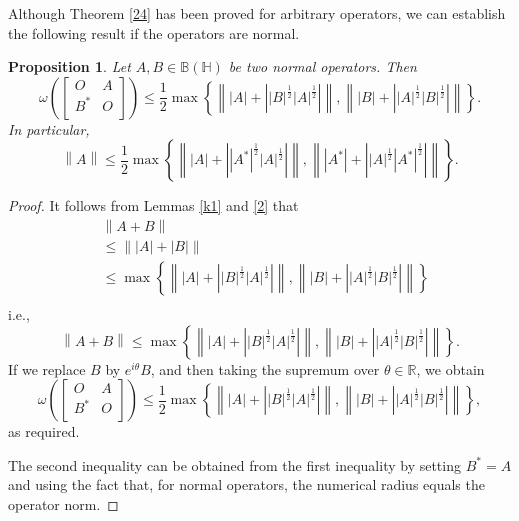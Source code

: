 \documentclass[12pt,twoside,reqno]{amsart}
\newtheorem{proposition}{Proposition}[section]
\numberwithin{equation}{section}
\begin{document}
Although Theorem \ref{24} has been proved for arbitrary operators, we can establish the following result if the operators are normal.
\begin{proposition}
Let $A, B\in \mathbb B\left( \mathbb H \right)$ be two normal operators. Then
\[\omega \left( \left[ \begin{matrix}
   O & A  \\
   {{B}^{*}} & O  \\
\end{matrix} \right] \right)\le \frac{1}{2}\max \left\{ \left\| \left| A \right|+\left| {{\left| B \right|}^{\frac{1}{2}}}{{\left| A \right|}^{\frac{1}{2}}} \right| \right\|,\left\| \left| B \right|+\left| {{\left| A \right|}^{\frac{1}{2}}}{{\left| B \right|}^{\frac{1}{2}}} \right| \right\| \right\}.\]
In particular,
\[\left\| A \right\|\le \frac{1}{2}\max \left\{ \left\| \left| A \right|+\left| {{\left| {{A}^{*}} \right|}^{\frac{1}{2}}}{{\left| A \right|}^{\frac{1}{2}}} \right| \right\|,\left\| \left| {{A}^{*}} \right|+\left| {{\left| A \right|}^{\frac{1}{2}}}{{\left| {{A}^{*}} \right|}^{\frac{1}{2}}} \right| \right\| \right\}.\]
\end{proposition}
\begin{proof}
It follows from Lemmas \ref{k1} and \ref{2} that
\[\begin{aligned}
  & \left\| A+B \right\| \\ 
 & \le \left\| \left| A \right|+\left| B \right| \right\| \\ 
 & \le \max \left\{ \left\| \left| A \right|+\left| {{\left| B \right|}^{\frac{1}{2}}}{{\left| A \right|}^{\frac{1}{2}}} \right| \right\|,\left\| \left| B \right|+\left| {{\left| A \right|}^{\frac{1}{2}}}{{\left| B \right|}^{\frac{1}{2}}} \right| \right\| \right\} \\ 
\end{aligned}\]
i.e.,
\begin{equation}\label{7}
\left\| A+B \right\|\le \max \left\{ \left\| \left| A \right|+\left| {{\left| B \right|}^{\frac{1}{2}}}{{\left| A \right|}^{\frac{1}{2}}} \right| \right\|,\left\| \left| B \right|+\left| {{\left| A \right|}^{\frac{1}{2}}}{{\left| B \right|}^{\frac{1}{2}}} \right| \right\| \right\}.
\end{equation}
If we replace $B$ by ${{e}^{i\theta }}B$, and then taking the supremum over $\theta \in \mathbb{R}$, we obtain
\[\omega \left( \left[ \begin{matrix}
   O & A  \\
   {{B}^{*}} & O  \\
\end{matrix} \right] \right)\le \frac{1}{2}\max \left\{ \left\| \left| A \right|+\left| {{\left| B \right|}^{\frac{1}{2}}}{{\left| A \right|}^{\frac{1}{2}}} \right| \right\|,\left\| \left| B \right|+\left| {{\left| A \right|}^{\frac{1}{2}}}{{\left| B \right|}^{\frac{1}{2}}} \right| \right\| \right\},\]
as required.

The second inequality can be obtained from the first inequality by setting $B^* = A$ and using the fact that, for normal operators, the numerical radius equals the operator norm.
\end{proof}
\end{document}
